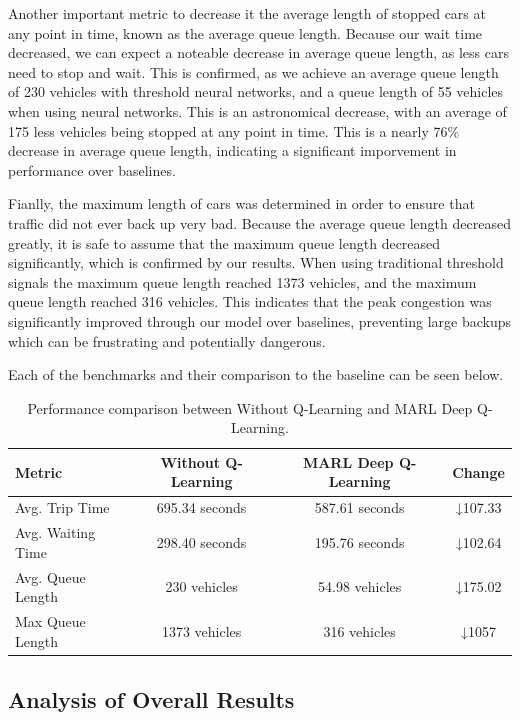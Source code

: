 \documentclass[conference]{IEEEtran}
\begin{document}
Another important metric to decrease it the average length of stopped cars at any point in time, known as the average queue length. Because our wait time decreased, we can expect a noteable decrease in average queue length, as less cars need to stop and wait. This is confirmed, as we achieve an average queue length of 230 vehicles with threshold neural networks, and a queue length of 55 vehicles when using neural networks. This is an astronomical decrease, with an average of 175 less vehicles being stopped at any point in time.  This is a nearly 76\% decrease in average queue length, indicating a significant imporvement in performance over baselines. 

Fianlly, the maximum length of cars was determined in order to ensure that traffic did not ever back up very bad. Because the average queue length decreased greatly, it is safe to assume that the maximum queue length decreased significantly, which is confirmed by our results. When using traditional threshold signals the maximum queue length reached 1373 vehicles, and the maximum queue length reached 316 vehicles. This indicates that the peak congestion was significantly improved through our model over baselines, preventing large backups which can be frustrating and potentially dangerous.

Each of the benchmarks and their comparison to the baseline can be seen below. 

\begin{table}[h!]
\centering
\begin{tabular}{|l|c|c|c|}
\hline
\textbf{Metric} & \textbf{Without Q-Learning} & \textbf{MARL Deep Q-Learning} & \textbf{Change} \\
\hline
Avg. Trip Time & 695.34 seconds & 587.61 seconds & ↓107.33 \\
\hline
Avg. Waiting Time & 298.40 seconds & 195.76 seconds & ↓102.64 \\
\hline
Avg. Queue Length & 230 vehicles & 54.98 vehicles & ↓175.02 \\
\hline
Max Queue Length & 1373 vehicles & 316 vehicles & ↓1057 \\
\hline
\end{tabular}
\caption{Performance comparison between Without Q-Learning and MARL Deep Q-Learning.}
\label{tab:comparison}
\end{table}

\subsection{Analysis of Overall Results}
\end{document}
